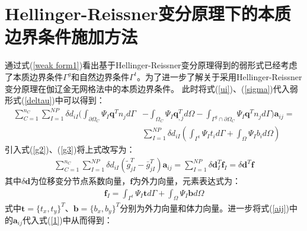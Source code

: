 \section{Hellinger-Reissner变分原理下的本质边界条件施加方法}
通过式(\ref{weak form1})看出基于Hellinger-Reissner变分原理得到的弱形式已经考虑了本质边界条件$\Gamma^g$和自然边界条件$\Gamma^t$。为了进一步了解关于采用Hellinger-Reissner变分原理在伽辽金无网格法中的本质边界条件。
此时将式(\ref{ui})、(\ref{sigma})代入弱形式(\ref{deltau})中可以得到：
\begin{equation}
\begin{split}
\sum_{C=1}^{n_C}\sum_{I=1}^{N\!P}\delta d_{iI}(\int_{\partial\Omega_C}\Psi_I\pmb{q}^Tn_jd\Gamma&-\int_{\Omega_C}\Psi_I\pmb{q}_{,j}^Td\Omega-\int_{\Gamma^g\cap\partial\Omega_C}\Psi_I\pmb{q}^Tn_jd\Gamma)\pmb{a}_{ij}=\\
&\sum_{I=1}^{N\!P}\delta d_{iI}(\int_{\Gamma^t}\Psi_It_id\Gamma+\int_{\Omega}\Psi_Ib_id\Omega)
\end{split}
\end{equation}
引入式(\ref{g2})、(\ref{g3})将上式改写为：
\begin{equation}\label{1}
\begin{split}
    \sum_{C=1}^{n_C}\sum_{I=1}^{N\!P}\delta d_{iI}(\tilde{g}_{jI}^T-\bar{g}_{jI}^T)\pmb{a}_{ij}=\sum_{I=1}^{N\!P}\delta\pmb{d}_I^T\pmb{f}_I=\delta\pmb{d}^T\pmb{f}
\end{split}
\end{equation}
其中$\delta\pmb{d}$为位移变分节点系数向量，$\pmb{f}$为外力向量，元素表达式为：
\begin{equation}
\begin{split}
    \pmb{f}_I=\int_{\Gamma^t}\Psi_I\pmb{t}d\Gamma+\int_{\Omega}\Psi_I\pmb{b}d\Omega
\end{split}
\end{equation}
式中$\pmb{t}=\{t_x,t_y\}^T\text{、}\pmb{b}=\{b_x,b_y\}^T$分别为外力向量和体力向量。进一步将式(\ref{aij})中的$\pmb{a}_{ij}$代入式(\ref{1})中从而得到：
